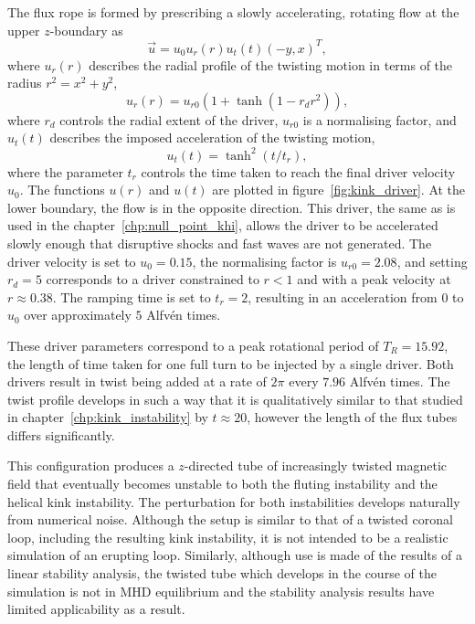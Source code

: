 The flux rope is formed by prescribing a slowly accelerating, rotating flow at the upper $z$-boundary as
\begin{equation}
  \label{eq:null_twisting_profile}
  \vec{u} = u_0 u_r(r) u_t(t) (-y, x)^T,
\end{equation}
where $u_r(r)$ describes the radial profile of the twisting motion in terms of the radius $r^2 = x^2 + y^2$,
\begin{equation}
  \label{eq:radial_twisting_function}
  u_r(r) = u_{r0}(1 + \tanh(1 - r_d r^2)),
\end{equation}
where $r_d$ controls the radial extent of the driver, $u_{r0}$ is a normalising factor, and $u_t(t)$ describes the imposed acceleration of the twisting motion,
\begin{equation}
  \label{eq:ramping_up_function}
  u_t(t) = \tanh^2(t/t_r),
\end{equation}
where the parameter $t_r$ controls the time taken to reach the final driver velocity $u_0$. The functions $u(r)$ and $u(t)$ are plotted in figure~\ref{fig:kink_driver}. At the lower boundary, the flow is in the opposite direction. This driver, the same as is used in the chapter~\ref{chp:null_point_khi}, allows the driver to be accelerated slowly enough that disruptive shocks and fast waves are not generated. The driver velocity is set to $u_0 = 0.15$, the normalising factor is $u_{r0} = 2.08$, and setting $r_d = 5$ corresponds to a driver constrained to $r<1$ and with a peak velocity at $r\approx 0.38$. The ramping time is set to $t_r = 2$, resulting in an acceleration from $0$ to $u_0$ over approximately $5$ Alfv\'en times. 

These driver parameters correspond to a peak rotational period of $T_R = 15.92$, the length of time taken for one full turn to be injected by a single driver. Both drivers result in twist being added at a rate of $2\pi$ every $7.96$ Alfv\'en times. The twist profile develops in such a way that it is qualitatively similar to that studied in chapter~\ref{chp:kink_instability} by $t\approx 20$, however the length of the flux tubes differs significantly. 

This configuration produces a $z$-directed tube of increasingly twisted magnetic field that eventually becomes unstable to both the fluting instability and the helical kink instability. The perturbation for both instabilities develops naturally from numerical noise. Although the setup is similar to that of a twisted coronal loop, including the resulting kink instability, it is not intended to be a realistic simulation of an erupting loop. Similarly, although use is made of the results of a linear stability analysis, the twisted tube which develops in the course of the simulation is not in MHD equilibrium and the stability analysis results have limited applicability as a result.

